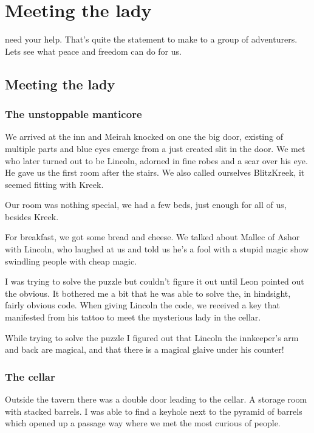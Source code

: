 \chapter{Meeting the lady}
\label{diary__maerwynn}

 need your help. That's quite the statement to make to a group of adventurers. Lets see what peace and freedom can do for us.

\section{Meeting the lady}
\subsection*{The unstoppable manticore}
We arrived at the inn and Meirah knocked on one the big door, existing of multiple parts and blue eyes emerge from a just created slit in the door. We met who later turned out to be Lincoln, adorned in fine robes and a scar over his eye. He gave us the first room after the stairs. We also called ourselves BlitzKreek, it seemed fitting with Kreek.

Our room was nothing special, we had a few beds, just enough for all of us, besides Kreek.

For breakfast, we got some bread and cheese. We talked about Mallec of Ashor with Lincoln, who laughed at us and told us he's a fool with a stupid magic show swindling people with cheap magic.

I was trying to solve the puzzle but couldn't figure it out until Leon pointed out the obvious. It bothered me a bit that he was able to solve the, in hindsight, fairly obvious code. When giving Lincoln the code, we received a key that manifested from his tattoo to meet the mysterious lady in the cellar.

\begin{DndReadAloud}
    While trying to solve the puzzle I figured out that Lincoln the innkeeper's arm and back are magical, and that there is a magical glaive under his counter!
\end{DndReadAloud}

\subsection*{The cellar}
Outside the tavern there was a double door leading to the cellar. A storage room with stacked barrels. I was able to find a keyhole next to the pyramid of barrels which opened up a passage way where we met the most curious of people.

